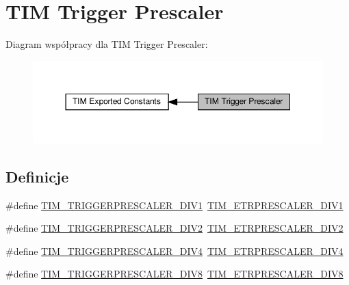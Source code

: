 \hypertarget{group___t_i_m___trigger___prescaler}{}\section{T\+IM Trigger Prescaler}
\label{group___t_i_m___trigger___prescaler}
Diagram współpracy dla T\+IM Trigger Prescaler\+:\nopagebreak
\begin{figure}[H]
\begin{center}
\leavevmode
\includegraphics[width=350pt]{group___t_i_m___trigger___prescaler}
\end{center}
\end{figure}
\subsection*{Definicje}
\begin{DoxyCompactItemize}
\item 
\#define \hyperlink{group___t_i_m___trigger___prescaler_ga02ab6f24e367cd972a1e0c1df326a7a3}{T\+I\+M\+\_\+\+T\+R\+I\+G\+G\+E\+R\+P\+R\+E\+S\+C\+A\+L\+E\+R\+\_\+\+D\+I\+V1}~\hyperlink{group___t_i_m___e_t_r___prescaler_gabead5364c62645592e42545ba09ab88a}{T\+I\+M\+\_\+\+E\+T\+R\+P\+R\+E\+S\+C\+A\+L\+E\+R\+\_\+\+D\+I\+V1}
\item 
\#define \hyperlink{group___t_i_m___trigger___prescaler_ga1350c5659a17a66df69b444871907d83}{T\+I\+M\+\_\+\+T\+R\+I\+G\+G\+E\+R\+P\+R\+E\+S\+C\+A\+L\+E\+R\+\_\+\+D\+I\+V2}~\hyperlink{group___t_i_m___e_t_r___prescaler_gaf7fe49f67bdb6b33b9b41953fee75680}{T\+I\+M\+\_\+\+E\+T\+R\+P\+R\+E\+S\+C\+A\+L\+E\+R\+\_\+\+D\+I\+V2}
\item 
\#define \hyperlink{group___t_i_m___trigger___prescaler_ga195dd56e15ea4733e19518fb431dfb8d}{T\+I\+M\+\_\+\+T\+R\+I\+G\+G\+E\+R\+P\+R\+E\+S\+C\+A\+L\+E\+R\+\_\+\+D\+I\+V4}~\hyperlink{group___t_i_m___e_t_r___prescaler_gaa09da30c3cd28f1fe6b6f3f599a5212c}{T\+I\+M\+\_\+\+E\+T\+R\+P\+R\+E\+S\+C\+A\+L\+E\+R\+\_\+\+D\+I\+V4}
\item 
\#define \hyperlink{group___t_i_m___trigger___prescaler_ga78edbcf4caf228de0daa4b7f698f578f}{T\+I\+M\+\_\+\+T\+R\+I\+G\+G\+E\+R\+P\+R\+E\+S\+C\+A\+L\+E\+R\+\_\+\+D\+I\+V8}~\hyperlink{group___t_i_m___e_t_r___prescaler_ga834e38200874cced108379b17a24d0b7}{T\+I\+M\+\_\+\+E\+T\+R\+P\+R\+E\+S\+C\+A\+L\+E\+R\+\_\+\+D\+I\+V8}
\end{DoxyCompactItemize}


